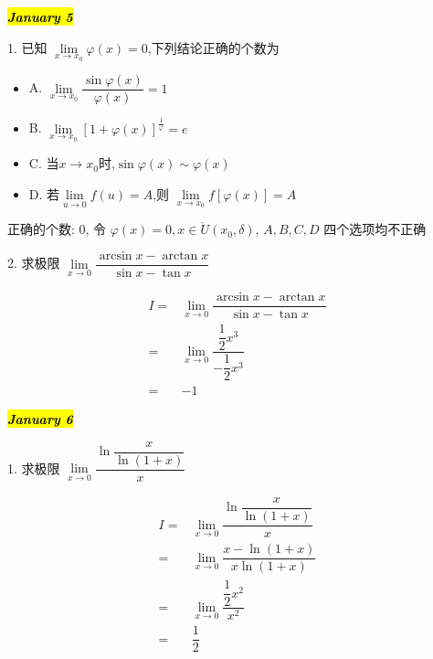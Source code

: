 \hl{\textbf{\textit{January 5}}}

1. 已知 $\lim\limits_{x\to x_{0}}\varphi(x)=0$,下列结论正确的个数为
\begin{itemize}
	\item A. $\lim\limits_{x\to x_{0}}\dfrac{\sin\varphi(x)}{\varphi(x)}=1$
	\item B. $\lim\limits_{x\to x_{0}}[1+\varphi(x)]^{\frac{1}{\varphi}}=e$
	\item C. 当$x\to x_{0}$时,$\sin \varphi(x)\sim \varphi(x)$
	\item D. 若$\lim\limits_{u\to 0}f(u)=A$,则 $\lim\limits_{x\to x_{0}}f[\varphi(x)]=A$
\end{itemize}
\begin{solution}

	正确的个数: $0$, 令 $\varphi(x) = 0,x\in \mathring{U}(x_{0},\delta)$, $A,B,C,D$ 四个选项均不正确
\end{solution}

2. 求极限 $\lim\limits_{x\to 0}\dfrac{\arcsin x-\arctan x}{\sin x-\tan x}$
\begin{solution}

	\begin{align*}
		I = & \lim\limits_{x\to 0}\dfrac{\arcsin x-\arctan x}{\sin x-\tan x}\\
		  = & \lim\limits_{x\to 0}\dfrac{\dfrac{1}{2}x^{3}}{-\dfrac{1}{2}x^{3}}\\
		  = & -1 
	\end{align*}
\end{solution}
\hl{\textbf{\textit{January 6}}}

1. 求极限 $\lim\limits_{x\to 0}\dfrac{\ln\dfrac{x}{\ln(1+x)}}{x}$
\begin{solution}

	\begin{align*}
		I = & \lim\limits_{x\to 0}\dfrac{\ln\dfrac{x}{\ln(1+x)}}{x}\\
		  = & \lim\limits_{x\to 0}\dfrac{x-\ln(1+x)}{x\ln (1+x)}\\
		  = & \lim\limits_{x\to 0}\dfrac{\dfrac{1}{2}x^{2}}{x^{2}}\\
		  = & \dfrac{1}{2}
	\end{align*}
\end{solution}

